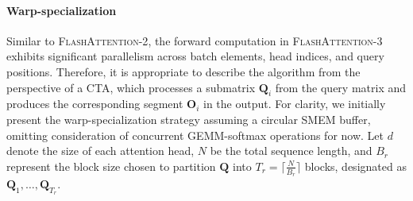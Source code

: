 \paragraph{Warp-specialization}
Similar to \textsc{FlashAttention-2}, the forward computation in \textsc{FlashAttention-3} exhibits significant parallelism across batch elements, head indices, and query positions. Therefore, it is appropriate to describe the algorithm from the perspective of a CTA, which processes a submatrix $\mathbf{Q}_i$ from the query matrix and produces the corresponding segment $\mathbf{O}_i$ in the output. For clarity, we initially present the warp-specialization strategy assuming a circular SMEM buffer, omitting consideration of concurrent GEMM-softmax operations for now. Let $d$ denote the size of each attention head, $N$ be the total sequence length, and $B_r$ represent the block size chosen to partition $\mathbf{Q}$ into $T_r = \lceil \frac{N}{B_r} \rceil$ blocks, designated as $\mathbf{Q}_1, \ldots, \mathbf{Q}_{T_r}$.


